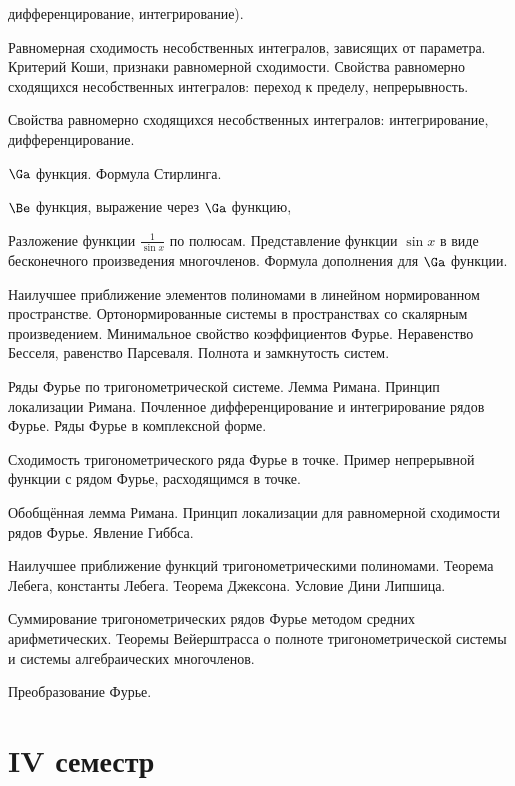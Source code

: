 \documentclass[a4paper]{article}
\begin{document}
\begin{nums}{-3}
дифференцирование, интегрирование).
\item Равномерная сходимость несобственных интегралов, зависящих от параметра. Критерий Коши,
признаки равномерной сходимости.   Свойства равномерно сходящихся несобственных интегралов: переход к
пределу, непрерывность.
\item Свойства равномерно сходящихся несобственных интегралов: интегрирование, дифференцирование.
\item $\Ga$ функция. Формула Стирлинга.
\item $\Be$ функция, выражение через $\Ga$ функцию,
\item Разложение функции $\frac{1}{\sin x}$ по полюсам. Представление функции $\sin x$ в виде бесконечного
произведения многочленов. Формула дополнения для $\Ga$ функции.
\item Наилучшее приближение элементов полиномами в линейном нормированном пространстве. Ортонормированные
системы в пространствах со скалярным произведением. Минимальное свойство коэффициентов Фурье.
Неравенство Бесселя, равенство Парсеваля. Полнота и замкнутость систем.
\item Ряды Фурье по тригонометрической системе. Лемма Римана. Принцип локализации Римана. Почленное
дифференцирование и интегрирование рядов Фурье. Ряды Фурье в комплексной форме.
\item Сходимость тригонометрического ряда Фурье в точке. Пример непрерывной функции с рядом
Фурье, расходящимся в точке.
\item Обобщённая лемма Римана. Принцип локализации для равномерной сходимости рядов Фурье. Явление Гиббса.
\item Наилучшее приближение функций тригонометрическими полиномами. Теорема Лебега, константы Лебега.
Теорема Джексона. Условие Дини Липшица.
\item Суммирование тригонометрических рядов Фурье методом средних арифметических. Теоремы Вейерштрасса
о полноте тригонометрической системы и системы алгебраических многочленов.
\item Преобразование Фурье.
\end{nums}

\pagebreak

\section*{IV семестр}
\end{document}
